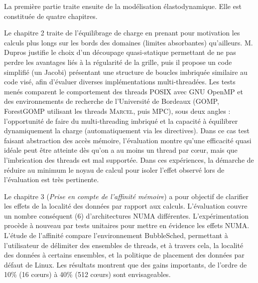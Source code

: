 \documentclass[a4paper,12pt]{article}
\begin{document}
La première partie traite ensuite de la modélisation élastodynamique.
Elle est constituée de quatre chapitres.  

Le chapitre 2 traite de l'équilibrage de charge en prenant pour motivation
les calculs plus longs sur les bords des domaines (limites absorbantes)
qu'ailleurs. M. Dupros justifie le choix d'un 
découpage quasi-statique permettant de ne pas perdre les avantages liés
à la régularité de la grille, puis il propose un code simplifié
(un Jacobi) présentant une structure de boucles imbriquée similaire au code visé, 
afin d'évaluer diverses implémentations multi-threadées.
Les tests menés comparent le comportement des threads POSIX avec 
GNU OpenMP et des environnements de recherche de l'Université 
de Bordeaux (GOMP, ForestGOMP utilisant les threads \textsc{Marcel}, puis MPC),
sous deux angles : l'opportunité de faire du multi-threading imbriqué
et la capacité à équilibrer dynamiquement la charge (automatiquement
via les directives).
Dans ce cas test faisant abstraction des accès mémoire, l'évaluation 
montre qu'une efficacité quasi idéale peut être atteinte dès qu'on
a au moins un thread par c{\oe}ur, mais que l'imbrication des threads
est mal supportée. Dans ces expériences, la démarche de réduire au minimum
le noyau de calcul pour isoler l'effet observé lors de l'évaluation est 
très pertinente.


Le chapitre 3 (\textit{Prise en compte de l'affinité mémoire}) a pour
objectif de clarifier les effets de la localité des données par 
rapport aux calculs. L'évaluation couvre un nombre conséquent (6) 
d'architectures NUMA différentes. L'expérimentation procède à nouveau 
par tests unitaires pour mettre en évidence les effets NUMA.
L'étude de l'affinité compare l'environnement BubbleSched, permettant
à l'utilisateur de délimiter des ensembles de threads, et à travers
cela, la localité des données à certains ensembles, 
et la politique de placement des données par défaut de Linux. 
Les résultats montrent que des gains importants, de l'ordre
de 10\% (16 c{\oe}urs) à 40\% (512 c{\oe}urs) sont envisageables.
\end{document}
